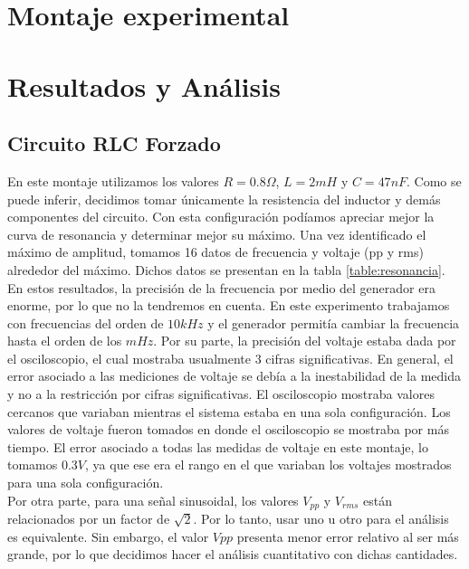 \documentclass[%
 reprint,
 amsmath,amssymb,
 aps,
]{revtex4-1}
\begin{document}
\section{\label{sec:level1}Montaje experimental}



\section{\label{sec:level1}Resultados y An\'alisis}

\subsection{\label{sec:level2}Circuito RLC Forzado}
En este montaje utilizamos los valores $R = 0.8\Omega$, $L = 2mH$ y $C = 47nF$. Como se puede inferir, decidimos tomar \'unicamente la resistencia del inductor y dem\'as componentes del circuito. Con esta configuraci\'on pod\'iamos apreciar mejor la curva de resonancia y determinar mejor su m\'aximo. Una vez identificado el m\'aximo de amplitud, tomamos 16 datos de frecuencia y voltaje (pp y rms) alrededor del m\'aximo. Dichos datos se presentan en la tabla \ref{table:resonancia}. \\

En estos resultados, la precisi\'on de la frecuencia por medio del generador era enorme, por lo que no la tendremos en cuenta. En este experimento trabajamos con frecuencias del orden de $10kHz$ y el generador permit\'ia cambiar la frecuencia hasta el orden de los $mHz$. Por su parte, la precisi\'on del voltaje estaba dada por el osciloscopio, el cual mostraba usualmente 3 cifras significativas. En general, el error asociado a las mediciones de voltaje se deb\'ia a la inestabilidad de la medida y no a la restricci\'on por cifras significativas. El osciloscopio mostraba valores cercanos que variaban mientras el sistema estaba en una sola configuraci\'on. Los valores de voltaje fueron tomados en donde el osciloscopio se mostraba por m\'as tiempo. El error asociado a todas las medidas de voltaje en este montaje, lo tomamos $0.3V$, ya que ese era el rango en el que variaban los voltajes mostrados para una sola configuraci\'on.\\

Por otra parte, para una señal sinusoidal, los valores $V_{pp}$ y $V_{rms}$ est\'an relacionados por un factor de $\sqrt{2}$. Por lo tanto, usar uno u otro para el an\'alisis es equivalente. Sin embargo, el valor $V{pp}$ presenta menor error relativo al ser m\'as grande, por lo que decidimos hacer el an\'alisis cuantitativo con dichas cantidades.\\
\end{document}
